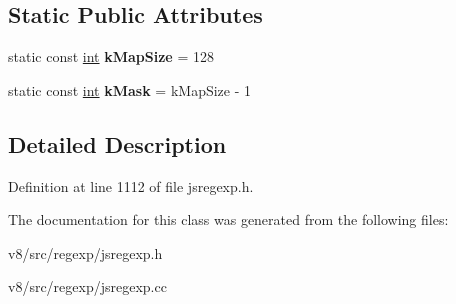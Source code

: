 \subsection*{Static Public Attributes}
\begin{DoxyCompactItemize}
\item 
\mbox{\label{classv8_1_1internal_1_1BoyerMoorePositionInfo_ab8b1a1e04adfde8ed8c5706d6dc2a9e0}} 
static const \mbox{\hyperlink{classint}{int}} {\bfseries k\+Map\+Size} = 128
\item 
\mbox{\label{classv8_1_1internal_1_1BoyerMoorePositionInfo_a4750e1206c312d908d4b503c8efdc3a8}} 
static const \mbox{\hyperlink{classint}{int}} {\bfseries k\+Mask} = k\+Map\+Size -\/ 1
\end{DoxyCompactItemize}


\subsection{Detailed Description}


Definition at line 1112 of file jsregexp.\+h.



The documentation for this class was generated from the following files\+:\begin{DoxyCompactItemize}
\item 
v8/src/regexp/jsregexp.\+h\item 
v8/src/regexp/jsregexp.\+cc\end{DoxyCompactItemize}
